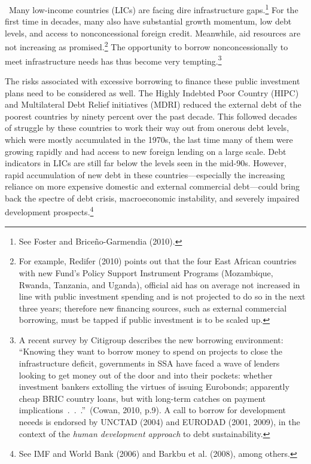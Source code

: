 \documentclass[11pt]{article}
\begin{document}
\quad\ \thinspace Many low-income countries (LICs) are facing dire
infrastructure gaps.\footnote{%
See Foster and Brice\~{n}o-Garmendia (2010).} For the first time in decades,
many also have substantial growth momentum, low debt levels, and access to
nonconcessional foreign credit. Meanwhile, aid resources are not increasing
as promised.\footnote{%
For example, Redifer (2010) points out that the four East African countries
with new Fund's Policy Support Instrument Programs (Mozambique, Rwanda,
Tanzania, and Uganda), official aid has on average not increased in line
with public investment spending and is not projected to do so in the next
three years; therefore new financing sources, such as external commercial
borrowing, must be tapped if public investment is to be scaled up.} The
opportunity to borrow nonconcessionally to meet infrastructure needs has
thus become very tempting.\footnote{%
A recent survey by Citigroup describes the new borrowing environment:
\textquotedblleft Knowing they want to borrow money to spend on projects to
close the infrastructure deficit, governments in SSA have faced a wave of
lenders looking to get money out of the door and into their pockets: whether
investment bankers extolling the virtues of issuing Eurobonds; apparently
cheap BRIC country loans, but with long-term catches on payment
implications\ .\ .\ .\textquotedblright\ (Cowan, 2010, p.9). A call to
borrow for development neeeds is endorsed by UNCTAD (2004) and EURODAD
(2001, 2009), in the context of the \textit{human development approach} to
debt sustainability.}

The risks associated with excessive borrowing to finance these public
investment plans need to be considered as well. The Highly Indebted Poor
Country (HIPC) and Multilateral Debt Relief initiatives (MDRI) reduced the
external debt of the poorest countries by ninety percent over the past
decade. This followed decades of struggle by these countries to work their
way out from onerous debt levels, which were mostly accumulated in the
1970s, the last time many of them were growing rapidly and had access to new
foreign lending on a large scale. Debt indicators in LICs are still far
below the levels seen in the mid-90s. However, rapid accumulation of new
debt in these countries---especially the increasing reliance on more
expensive domestic and external commercial debt---could bring back the
spectre of debt crisis, macroeconomic instability, and severely impaired
development prospects.\footnote{%
See IMF and World Bank (2006) and Barkbu et al. (2008), among others.}
\end{document}
